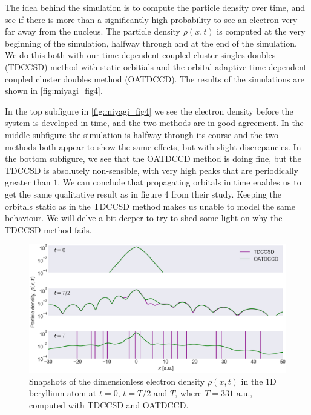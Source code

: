 The idea behind the simulation is to compute the particle density over time, and see if 
there is more than a significantly high probability to see an electron very far away from the 
nucleus. The particle density 
$\rho(x, t)$ is computed at the very beginning of the simulation, halfway through 
and at the end of the simulation. We do this both with our time-dependent coupled 
cluster singles doubles (TDCCSD) method with static orbitials and 
the orbital-adaptive time-dependent 
coupled cluster doubles method (OATDCCD). 
The results of the simulations are shown in 
\autoref{fig:miyagi_fig4}.

In the top subfigure in \autoref{fig:miyagi_fig4} we see the electron density before 
the system is developed in time, and the two methods are in good agreement. In 
the middle subfigure the simulation is halfway through its course and the two methods
both appear to show the same effects, but with 
slight discrepancies. In the bottom subfigure, we see that the OATDCCD method is doing
fine, but the TDCCSD is absolutely non-sensible, with very high peaks that are periodically 
greater than $1$. We can conclude that propagating 
orbitals in time enables us to get the same qualitative result as \citeauthor{miyagi2013time}
in figure 4 from their study. Keeping the orbitals static as in the TDCCSD method makes 
us unable to model the same behaviour. We will delve a bit deeper to try to shed 
some light on why the TDCCSD method fails.

\begin{figure}
    \centering
    \includegraphics[width=\textwidth]{results/figures/miyagi/fig4_miqyagi.png} 
    \caption{Snapshots of the dimensionless electron density $\rho(x, t)$ in the 1D beryllium atom 
        at $t=0$, $t=T/2$ and $T$, where $T = 331 \text{ a.u.}$,
        computed with TDCCSD and OATDCCD. 
    }
    \label{fig:miyagi_fig4}
\end{figure}


